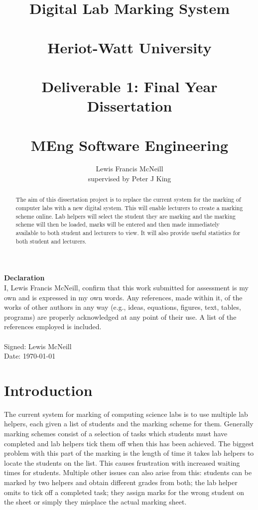 \documentclass[12pt]{article}  %
\title{Digital Lab Marking System \\~\\  \large{Heriot-Watt University} \\~\\ Deliverable 1: Final Year Dissertation \\~\\ MEng Software Engineering}
\author{Lewis Francis McNeill\\
supervised by
Peter J King}
\begin{document}
\maketitle
{}



\newpage
\setcounter{page}{1}
\doublespacing
\textbf{\Large{Declaration}} \\[2em]
I, Lewis Francis McNeill, confirm that this work submitted for assessment is my own and is expressed in my own words. Any references, made within it, of the works of other authors in any way (e.g., ideas, equations, figures, text, tables, programs) are properly acknowledged at any point of their use. A list of the references employed is included.
\\
\\
Signed: Lewis McNeill
\\
Date: \today


\newpage               
\begin{abstract}
\noindent
The aim of this dissertation project is to replace the current system for the marking of computer labs with a new digital system. This will enable lecturers to create a marking scheme online. Lab helpers will select the student they are marking and the marking scheme will then be loaded, marks will be entered and then made immediately available to both student and lecturers to view. It will also provide useful statistics for both student and lecturers.
\end{abstract}
\newpage 

\tableofcontents
\newpage
\listoffigures
\listoftables
\lstlistoflistings


\newpage   
\setcounter{page}{1}
\section{Introduction}

The current system for marking of computing science labs is to use multiple lab helpers, each given a list of students and the marking scheme for them. Generally marking schemes consist of a selection of tasks which students must have completed and lab helpers tick them off when this has been achieved. The biggest problem with this part of the marking is the length of time it takes lab helpers to locate the students on the list. This causes frustration with increased waiting times for students.  Multiple other issues  can also  arise from this: students can be marked by two helpers and obtain different grades from both; the lab helper omits to  tick off a completed task; they assign  marks for the wrong student on the sheet or simply they misplace the actual marking sheet.
\end{document}
